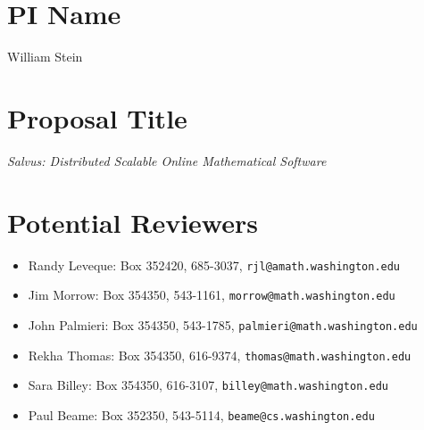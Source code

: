 \documentclass[11pt]{article}
\begin{document}
\mbox{}\vspace{4ex}

\section*{PI Name} 
William Stein

\vspace{3ex}
\section*{Proposal Title} 
{\em Salvus: Distributed Scalable Online Mathematical Software}

\vspace{3ex}

\section*{Potential Reviewers}

\begin{itemize}
\item Randy Leveque: Box 352420, 685-3037, {\tt rjl@amath.washington.edu}
\item Jim Morrow: Box 354350, 543-1161, {\tt morrow@math.washington.edu}
\item John Palmieri: Box 354350, 543-1785, {\tt palmieri@math.washington.edu}
\item Rekha Thomas: Box 354350, 616-9374, {\tt thomas@math.washington.edu}
\item Sara Billey: Box 354350, 616-3107, {\tt billey@math.washington.edu}
\item Paul Beame: Box 352350, 543-5114, {\tt beame@cs.washington.edu}
\end{itemize}
\end{document}
